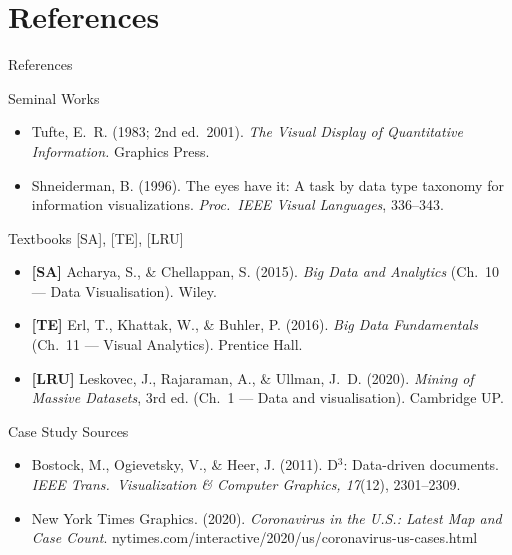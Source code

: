 \documentclass[aspectratio=169,10pt]{beamer}
\begin{document}
\section*{References}

\begin{frame}{References}
  \begin{block}{Seminal Works}
    \begin{itemize}
      \item Tufte, E.~R. (1983; 2nd ed.\ 2001).
            \textit{The Visual Display of Quantitative Information.}
            Graphics Press.
      \item Shneiderman, B. (1996).
            The eyes have it: A task by data type taxonomy for
            information visualizations.
            \textit{Proc.\ IEEE Visual Languages}, 336--343.
    \end{itemize}
  \end{block}
  \vspace{4pt}
  \begin{block}{Textbooks \textmd{[SA], [TE], [LRU]}}
    \begin{itemize}
      \item \textbf{[SA]} Acharya, S., \& Chellappan, S. (2015).
            \textit{Big Data and Analytics}
            (Ch.~10 — Data Visualisation). Wiley.
      \item \textbf{[TE]} Erl, T., Khattak, W., \& Buhler, P. (2016).
            \textit{Big Data Fundamentals}
            (Ch.~11 — Visual Analytics). Prentice Hall.
      \item \textbf{[LRU]} Leskovec, J., Rajaraman, A., \&
            Ullman, J.~D. (2020).
            \textit{Mining of Massive Datasets}, 3rd ed.
            (Ch.~1 — Data and visualisation). Cambridge UP.
    \end{itemize}
  \end{block}
  \vspace{4pt}
  \begin{block}{Case Study Sources}
    \begin{itemize}
      \item Bostock, M., Ogievetsky, V., \& Heer, J. (2011).
            D$^3$: Data-driven documents.
            \textit{IEEE Trans.\ Visualization \& Computer Graphics,
            17}(12), 2301--2309.
      \item New York Times Graphics. (2020).
            \textit{Coronavirus in the U.S.: Latest Map and Case Count}.
            nytimes.com/interactive/2020/us/coronavirus-us-cases.html
    \end{itemize}
  \end{block}
\end{frame}
\end{document}
